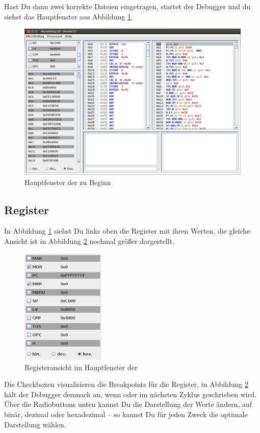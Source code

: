Hast Du dann zwei korrekte Dateien eingetragen, startet der Debugger und du siehst das Hauptfenster aus Abbildung \ref{fig:main-frame-onbegin}.

\begin{figure}[h]
	\centering
	\includegraphics[width=0.8\linewidth]{images/main-frame-onbegin}
	\caption{Hauptfenster der \mdg{} zu Beginn}
	\label{fig:main-frame-onbegin}
\end{figure}

\subsection{Register}
In Abbildung \ref{fig:main-frame-onbegin} siehst Du links oben die Register mit ihren Werten, die gleiche Ansicht ist in Abbildung \ref{fig:main-frame-registers} nochmal größer dargestellt.

\begin{figure}[h]
	\centering
	\includegraphics[width=4cm]{images/main-frame-registers}
	\caption{Registeransicht im Hauptfenster der \mdg{}}
	\label{fig:main-frame-registers}
\end{figure}

Die Checkboxen visualisieren die Breakpoints für die Register, in Abbildung \ref{fig:main-frame-registers} hält der Debugger demnach an, wenn  oder  im nächsten Zyklus geschrieben wird. Über die Radiobuttons unten kannst Du die Darstellung der Werte ändern, auf binär, dezimal oder hexadezimal -- so kannst Du für jeden Zweck die optimale Darstellung wählen.


